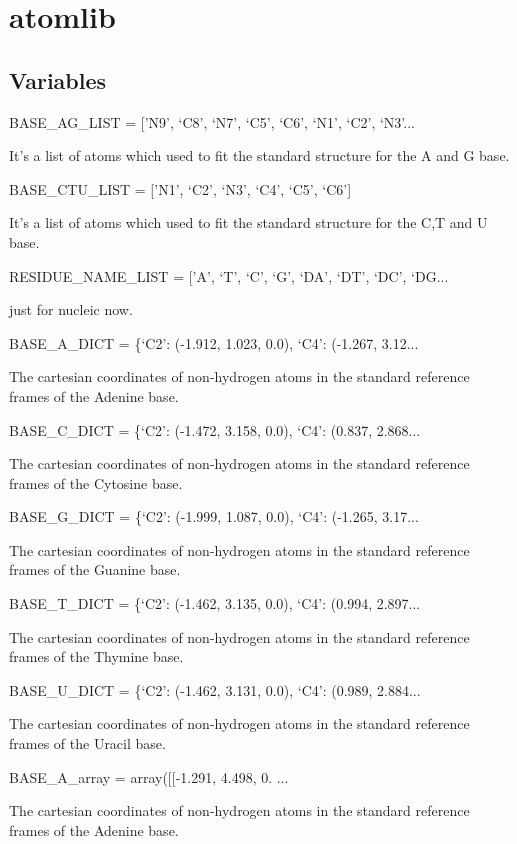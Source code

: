 \documentclass[letterpaper,10pt,english]{sphinxmanual}
\begin{document}
\section{atomlib}
\label{documentation_pages/modules/atomlib::doc}\label{documentation_pages/modules/atomlib:atomlib}

\subsection{Variables}
\label{documentation_pages/modules/atomlib:variables}
BASE\_AG\_LIST = {[}'N9', `C8', `N7', `C5', `C6', `N1', `C2', `N3'...

It's a list of atoms which used to fit the standard structure for the A and G base.

BASE\_CTU\_LIST = {[}'N1', `C2', `N3', `C4', `C5', `C6'{]}

It's a list of atoms which used to fit the standard structure for the C,T and U base.

RESIDUE\_NAME\_LIST = {[}'A', `T', `C', `G', `DA', `DT', `DC', `DG...

just for nucleic now.

BASE\_A\_DICT = \{`C2': (-1.912, 1.023, 0.0), `C4': (-1.267, 3.12...

The cartesian coordinates of non-hydrogen atoms in the standard reference frames of the Adenine base.

BASE\_C\_DICT = \{`C2': (-1.472, 3.158, 0.0), `C4': (0.837, 2.868...

The cartesian coordinates of non-hydrogen atoms in the standard reference frames of the Cytosine base.

BASE\_G\_DICT = \{`C2': (-1.999, 1.087, 0.0), `C4': (-1.265, 3.17...

The cartesian coordinates of non-hydrogen atoms in the standard reference frames of the Guanine base.

BASE\_T\_DICT = \{`C2': (-1.462, 3.135, 0.0), `C4': (0.994, 2.897...

The cartesian coordinates of non-hydrogen atoms in the standard reference frames of the Thymine base.

BASE\_U\_DICT = \{`C2': (-1.462, 3.131, 0.0), `C4': (0.989, 2.884...

The cartesian coordinates of non-hydrogen atoms in the standard reference frames of the Uracil base.

BASE\_A\_array = array({[}{[}-1.291, 4.498, 0. ...

The cartesian coordinates of non-hydrogen atoms in the standard reference frames of the Adenine base.
\end{document}
